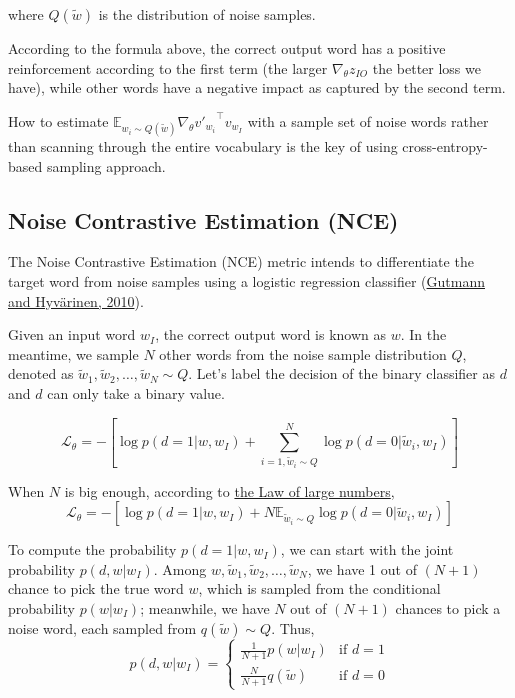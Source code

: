 where $Q(\tilde{w})$ is the distribution of noise samples.

According to the formula above, the correct output word has a positive reinforcement according to the first term (the larger $\nabla_\theta z_{IO}$ the better loss we have), while other words have a negative impact as captured by the second term.

How to estimate $\mathbb{E}_{w_i \sim Q(\tilde{w})} \nabla_\theta {v'_{w_i}}^{\top}{v_{w_I}}$ with a sample set of noise words rather than scanning through the entire vocabulary is the key of using cross-entropy-based sampling approach.

\subsection{Noise Contrastive Estimation (NCE)}
The Noise Contrastive Estimation (NCE) metric intends to differentiate the target word from noise samples using a logistic regression classifier (\href{http://proceedings.mlr.press/v9/gutmann10a/gutmann10a.pdf}{Gutmann and Hyvärinen, 2010}).

Given an input word $w_I$, the correct output word is known as $w$. In the meantime, we sample $N$ other words from the noise sample distribution $Q$, denoted as $\tilde{w}_1, \tilde{w}_2, \dots, \tilde{w}_N \sim Q$. Let's label the decision of the binary classifier as $d$ and $d$ can only take a binary value.

\[
\mathcal{L}_\theta = - [ \log p(d=1 \vert w, w_I) + \sum_{i=1, \tilde{w}_i \sim Q}^N \log p(d=0|\tilde{w}_i, w_I) ]
\]

When $N$ is big enough, according to \href{https://en.wikipedia.org/wiki/Law_of_large_numbers}{the Law of large numbers},
\[
\mathcal{L}_\theta = - [ \log p(d=1 \vert w, w_I) +  N\mathbb{E}_{\tilde{w}_i \sim Q} \log p(d=0|\tilde{w}_i, w_I)]
\]

To compute the probability $p(d=1 \vert w, w_I)$, we can start with the joint probability $p(d, w \vert w_I)$. Among $w, \tilde{w}_1, \tilde{w}_2, \dots, \tilde{w}_N$, we have 1 out of $(N+1)$ chance to pick the true word $w$, which is sampled from the conditional probability $p(w \vert w_I)$; meanwhile, we have $N$ out of $(N+1)$ chances to pick a noise word, each sampled from $q(\tilde{w}) \sim Q$. Thus,
\[
p(d, w | w_I) = 
  \begin{cases}
  \frac{1}{N+1} p(w \vert w_I) & \text{if } d=1 \\
  \frac{N}{N+1} q(\tilde{w}) & \text{if } d=0
  \end{cases}
\]

